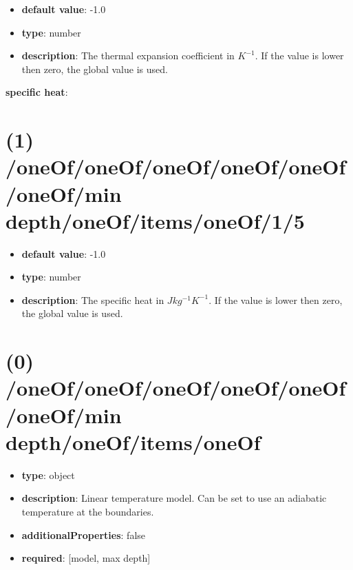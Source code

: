 \begin{itemize}[leftmargin=1em]\item {\bf default value}: -1.0
\item {\bf type}: number
\item {\bf description}: The thermal expansion coefficient in $K^{-1}$. If the value is lower then zero, the global value is used.
\end{itemize}\item {\bf specific heat}: \section{(1) /oneOf/oneOf/oneOf/oneOf/oneOf/oneOf/min depth/oneOf/items/oneOf/1/5}
\begin{itemize}[leftmargin=1em]\item {\bf default value}: -1.0
\item {\bf type}: number
\item {\bf description}: The specific heat in $J kg^{-1} K^{-1}$. If the value is lower then zero, the global value is used.
\end{itemize}\section{(0) /oneOf/oneOf/oneOf/oneOf/oneOf/oneOf/min depth/oneOf/items/oneOf}
\begin{itemize}[leftmargin=0em]\item {\bf type}: object
\item {\bf description}: Linear temperature model. Can be set to use an adiabatic temperature at the boundaries.
\item {\bf additionalProperties}: false
\item {\bf required}: [model, max depth]\end{itemize}

